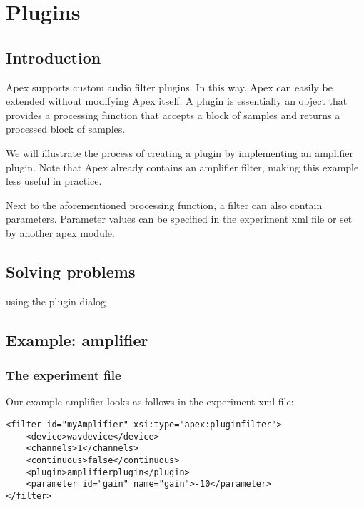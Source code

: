 

\chapter{Plugins}
\label{chap:plugins}

\section{Introduction}
Apex supports custom audio filter plugins. In this way, Apex can easily be extended without modifying Apex itself. A plugin is essentially an object that provides a processing function that accepts a block of samples and returns a processed block of samples.

We will illustrate the process of creating a plugin by implementing an amplifier plugin. Note that Apex already contains an amplifier filter, making this example less useful in practice.

Next to the aforementioned processing function, a filter can also contain parameters. Parameter values can be specified in the experiment xml file or set by another apex module.

\label{sec:plugins}

\section{Solving problems}

using the plugin dialog


\section{Example: amplifier}


\subsection{The experiment file}

Our example amplifier looks as follows in the experiment xml file:

\begin{verbatim}
<filter id="myAmplifier" xsi:type="apex:pluginfilter">
    <device>wavdevice</device>
    <channels>1</channels>
    <continuous>false</continuous>
    <plugin>amplifierplugin</plugin>
    <parameter id="gain" name="gain">-10</parameter>
</filter>
\end{verbatim}


